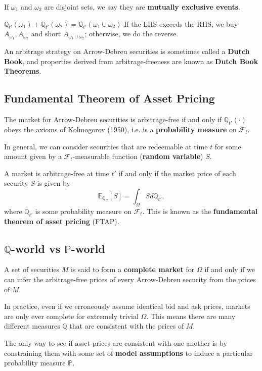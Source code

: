 \documentclass{article}
\begin{document}
If $\omega_1$ and $\omega_2$ are disjoint sets, we say they are \textbf{mutually exclusive events}.
\begin{block}{$\mathbb{Q}_{t'}(\omega_1) + \mathbb{Q}_{t'}(\omega_2) = \mathbb{Q}_{t'}(\omega_1 \cup \omega_2)$}
	If the LHS exceeds the RHS, we buy $A_{\omega_1},A_{\omega_2}$ and short $A_{\omega_1\cup\omega_2}$; otherwise, we do the reverse.
\end{block}

An arbitrage strategy on Arrow-Debreu securities is sometimes called a \textbf{Dutch Book}, and properties derived from arbitrage-freeness are known as \textbf{Dutch Book Theorems}.

\subsection{Fundamental Theorem of Asset Pricing}
The market for Arrow-Debreu securities is arbitrage-free if and only if $\mathbb{Q}_{t'}(\cdot)$ obeys the axioms of Kolmogorov (1950), i.e. is a \textbf{probability measure} on $\mathcal{F}_t$.

In general, we can consider securities that are redeemable at time $t$ for some amount given by a $\mathcal{F}_t$-measurable function (\textbf{random variable}) $S$.

A market is arbitrage-free at time $t'$ if and only if the market price of each security $S$ is given by
$$\mathbb{E}_{\mathbb{Q}_{t'}}[S] = \int_\Omega S d\mathbb{Q}_{t'},$$
where $\mathbb{Q}_{t'}$ is some probability measure on $\mathcal{F}_t$. This is known as the \textbf{fundamental theorem of asset pricing} (FTAP).

\subsection{$\mathbb{Q}$-world vs $\mathbb{P}$-world}
A set of securities $M$ is said to form a \textbf{complete market} for $\Omega$ if and only if we can infer the arbitrage-free prices of every Arrow-Debreu security from the prices of $M$.

In practice, even if we erroneously assume identical bid and ask prices, markets are only ever complete for extremely trivial $\Omega$. This means there are many different measures $\mathbb{Q}$ that are consistent with the prices of $M$.

The only way to see if asset prices are consistent with one another is by constraining them with some set of \textbf{model assumptions} to induce a particular probability measure $\mathbb{P}$.
\end{document}

